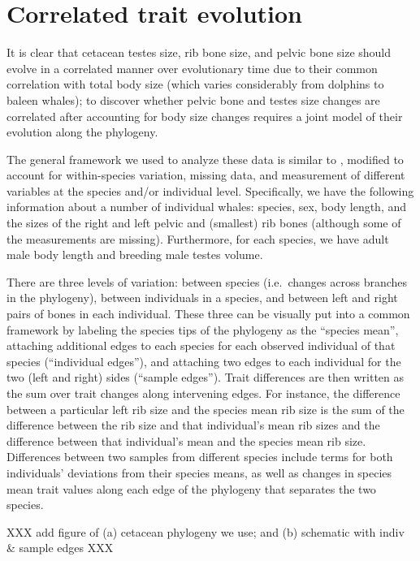\documentclass{article}
\begin{document}
\section{Correlated trait evolution}

It is clear that cetacean testes size, rib bone size, and pelvic bone size
should evolve in a correlated manner over evolutionary time
due to their common correlation with total body size 
(which varies considerably from dolphins to baleen whales);
to discover whether pelvic bone and testes size changes are correlated
after accounting for body size changes
requires a joint model of their evolution along the phylogeny.

The general framework we used to analyze these data is similar to \citet{XXX},
modified to account for within-species variation,
missing data,
and measurement of different variables at the species and/or individual level.
Specifically, we have the following information about a number of individual whales:
species, sex, body length,
and the sizes of the right and left pelvic and (smallest) rib bones
(although some of the measurements are missing).
Furthermore, for each species, we have
adult male body length and
breeding male testes volume.

There are three levels of variation:
between species (i.e.\ changes across branches in the phylogeny),
between individuals in a species,
and between left and right pairs of bones in each individual.
These three can be visually put into a common framework by 
labeling the species tips of the phylogeny as the ``species mean'',
attaching additional edges to each species for each observed individual of that species (``individual edges''),
and attaching two edges to each individual for the two (left and right) sides (``sample edges'').
Trait differences are then written as the sum over trait changes along intervening edges.
For instance, the difference between a particular left rib size and the species mean rib size
is the sum of the difference between the rib size and that individual's mean rib sizes 
and the difference between that individual's mean and the species mean rib size.
Differences between two samples from different species include terms for both individuals' deviations from their species means,
as well as changes in species mean trait values along each edge of the phylogeny that separates the two species.

XXX add figure of (a) cetacean phylogeny we use; and (b) schematic with indiv \& sample edges XXX
\end{document}
